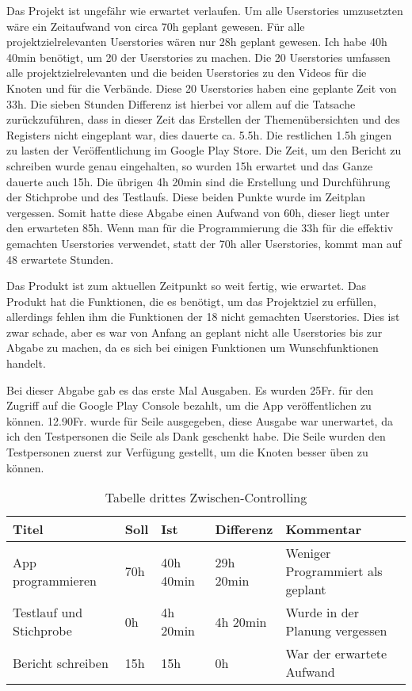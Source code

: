 Das Projekt ist ungefähr wie erwartet verlaufen. Um alle Userstories umzusetzten wäre ein Zeitaufwand von circa 70h geplant gewesen. Für alle projektzielrelevanten Userstories wären nur 28h geplant gewesen. Ich habe 40h 40min benötigt, um 20 der Userstories zu machen. Die 20 Userstories umfassen alle projektzielrelevanten und die beiden Userstories zu den Videos für die Knoten und für die Verbände. Diese 20 Userstories haben eine geplante Zeit von 33h. Die sieben Stunden Differenz ist hierbei vor allem auf die Tatsache zurückzuführen, dass in dieser Zeit das Erstellen der Themenübersichten und des Registers nicht eingeplant war, dies dauerte ca. 5.5h. Die restlichen 1.5h gingen zu lasten der Veröffentlichung im Google Play Store. Die Zeit, um den Bericht zu schreiben wurde genau eingehalten, so wurden 15h erwartet und das Ganze dauerte auch 15h. Die übrigen 4h 20min sind die Erstellung und Durchführung der Stichprobe und des Testlaufs. Diese beiden Punkte wurde im Zeitplan vergessen. Somit hatte diese Abgabe einen Aufwand von 60h, dieser liegt unter den erwarteten 85h. Wenn man für die Programmierung die 33h für die effektiv gemachten Userstories verwendet, statt der 70h aller Userstories, kommt man auf 48 erwartete Stunden.\par 
Das Produkt ist zum aktuellen Zeitpunkt so weit fertig, wie erwartet. Das Produkt hat die Funktionen, die es benötigt, um das Projektziel zu erfüllen, allerdings fehlen ihm die Funktionen der 18 nicht gemachten Userstories. Dies ist zwar schade, aber es war von Anfang an geplant nicht alle Userstories bis zur Abgabe zu machen, da es sich bei einigen Funktionen um Wunschfunktionen handelt. \par 
Bei dieser Abgabe gab es das erste Mal Ausgaben. Es wurden 25Fr. für den Zugriff auf die Google Play Console bezahlt, um die App veröffentlichen zu können. 12.90Fr. wurde für Seile ausgegeben, diese Ausgabe war unerwartet, da ich den Testpersonen die Seile als Dank geschenkt habe. Die Seile wurden den Testpersonen zuerst zur Verfügung gestellt, um die Knoten besser üben zu können.

\begin{table}[h]
    \begin{tabularx}{\textwidth}{X|X|X|X|X}
        \textbf{Titel} & \textbf{Soll} & \textbf{Ist} & \textbf{Differenz} & \textbf{Kommentar} \\ \hline
        App programmieren & 70h & 40h 40min & 29h 20min & Weniger Programmiert als geplant \\\hline
        Testlauf und Stichprobe & 0h & 4h 20min & 4h 20min & Wurde in der Planung vergessen \\\hline
        Bericht schreiben & 15h & 15h & 0h & War der erwartete Aufwand \\
    \end{tabularx}
    \caption{Tabelle drittes Zwischen-Controlling}
\end{table}


